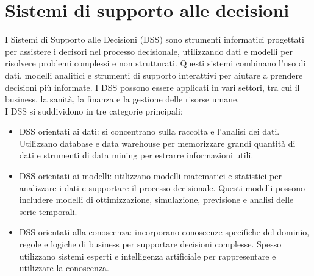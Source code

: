 \chapter{Sistemi di supporto alle decisioni}
\label{cap:sistemi-supporto-decisioni}

I Sistemi di Supporto alle Decisioni (DSS) sono strumenti informatici progettati per assistere i decisori nel processo decisionale, utilizzando dati e modelli per risolvere problemi complessi e non strutturati. Questi sistemi combinano l'uso di dati, modelli analitici e strumenti di supporto interattivi per aiutare a prendere decisioni più informate. I DSS possono essere applicati in vari settori, tra cui il business, la sanità, la finanza e la gestione delle risorse umane.\\
I DSS si suddividono in tre categorie principali:
\begin{itemize}
    \item DSS orientati ai dati: si concentrano sulla raccolta e l'analisi dei dati. Utilizzano database e data warehouse per memorizzare grandi quantità di dati e strumenti di data mining per estrarre informazioni utili.
    \item DSS orientati ai modelli: utilizzano modelli matematici e statistici per analizzare i dati e supportare il processo decisionale. Questi modelli possono includere modelli di ottimizzazione, simulazione, previsione e analisi delle serie temporali.
    \item DSS orientati alla conoscenza: incorporano conoscenze specifiche del dominio, regole e logiche di business per supportare decisioni complesse. Spesso utilizzano sistemi esperti e intelligenza artificiale per rappresentare e utilizzare la conoscenza.
\end{itemize}

